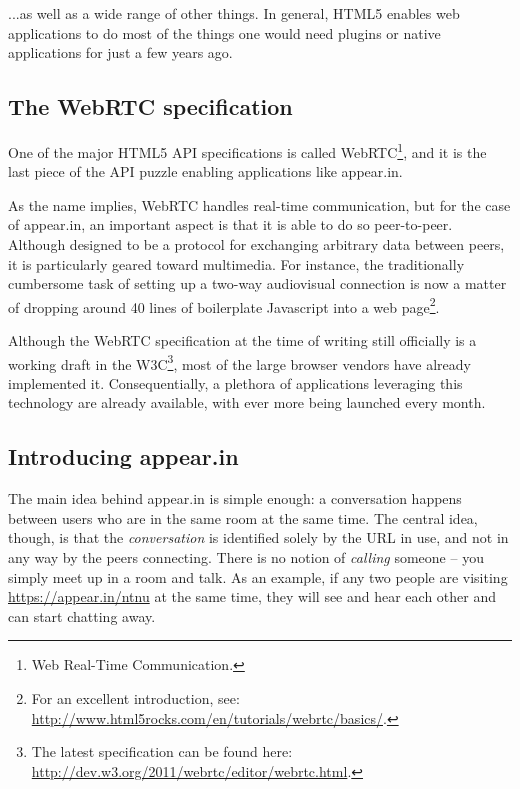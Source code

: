     ...as well as a wide range of other things. In general, HTML5 enables web applications to do most of the things one would need plugins or native applications for just a few years ago.

  \subsection{The WebRTC specification}
  \label{survey:webrtc}

    One of the major HTML5 API specifications is called WebRTC\footnote{Web Real-Time Communication.}, and it is the last piece of the API puzzle enabling applications like appear.in.

    As the name implies, WebRTC handles real-time communication, but for the case of appear.in, an important aspect is that it is able to do so peer-to-peer. Although designed to be a protocol for exchanging arbitrary data between peers, it is particularly geared toward multimedia. For instance, the traditionally cumbersome task of setting up a two-way audiovisual connection is now a matter of dropping around 40 lines of boilerplate Javascript into a web page\footnote{For an excellent introduction, see: \url{http://www.html5rocks.com/en/tutorials/webrtc/basics/}.}.

    Although the WebRTC specification at the time of writing still officially is a working draft in the W3C\footnote{The latest specification can be found here: \url{http://dev.w3.org/2011/webrtc/editor/webrtc.html}.}, most of the large browser vendors have already implemented it. Consequentially, a plethora of applications leveraging this technology are already available, with ever more being launched every month.

  \subsection{Introducing appear.in}
  \label{survey:introducing_appearin}

    The main idea behind appear.in is simple enough: a conversation happens between users who are in the same room at the same time. The central idea, though, is that the \emph{conversation} is identified solely by the URL in use, and not in any way by the peers connecting. There is no notion of \emph{calling} someone -- you simply meet up in a room and talk. As an example, if any two people are visiting \url{https://appear.in/ntnu} at the same time, they will see and hear each other and can start chatting away.


